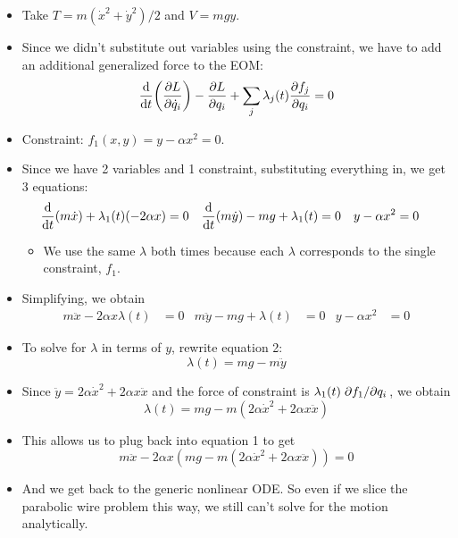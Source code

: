 \documentclass[../notes.tex]{subfiles}
\begin{document}
\begin{itemize}
\begin{itemize}
        \item Take $T=m(\dot{x}^2+\dot{y}^2)/2$ and $V=mgy$.
        \item Since we didn't substitute out variables using the constraint, we have to add an additional generalized force to the EOM:
        \begin{equation*}
            \dv{t}(\pdv{L}{\dot{q}_i})-\pdv{L}{q_i}+\sum_j\lambda_j(t)\pdv{f_j}{q_i} = 0
        \end{equation*}
        \item Constraint: $f_1(x,y)=y-\alpha x^2=0$.
        \item Since we have 2 variables and 1 constraint, substituting everything in, we get 3 equations:
        \begin{align*}
            \dv{t}(m\dot{x})+\lambda_1(t)(-2\alpha x) &= 0&
            \dv{t}(m\dot{y})-mg+\lambda_1(t) &= 0&
            y-\alpha x^2 &= 0
        \end{align*}
        \begin{itemize}
            \item We use the same $\lambda$ both times because each $\lambda$ corresponds to the single constraint, $f_1$.
        \end{itemize}
        \item Simplifying, we obtain
        \begin{align*}
            m\ddot{x}-2\alpha x\lambda(t) &= 0&
            m\ddot{y}-mg+\lambda(t) &= 0&
            y-\alpha x^2 &= 0
        \end{align*}
        \item To solve for $\lambda$ in terms of $y$, rewrite equation 2:
        \begin{equation*}
            \lambda(t) = mg-m\ddot{y}
        \end{equation*}
        \item Since $\ddot{y}=2\alpha\dot{x}^2+2\alpha x\ddot{x}$ and the force of constraint is $\lambda_1(t)\pdv*{f_1}{q_i}$, we obtain
        \begin{equation*}
            \lambda(t) = mg-m(2\alpha\dot{x}^2+2\alpha x\ddot{x})
        \end{equation*}
        \item This allows us to plug back into equation 1 to get
        \begin{equation*}
            m\ddot{x}-2\alpha x(mg-m(2\alpha\dot{x}^2+2\alpha x\ddot{x})) = 0
        \end{equation*}
        \item And we get back to the generic nonlinear ODE. So even if we slice the parabolic wire problem this way, we still can't solve for the motion analytically.

\end{itemize}
\end{itemize}
\end{document}
